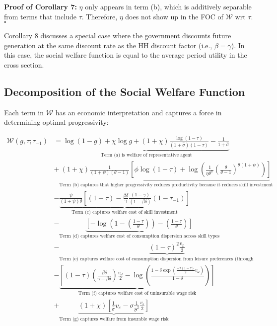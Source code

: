 \documentclass{article}
\begin{document}
\bigskip

\textbf{Proof of Corollary 7:} $\eta$ only appears in term (b), which is additively separable from terms that include $\tau$. Therefore, $\eta$ does not show up in the FOC of $\mathcal{W}$ wrt $\tau$. $\square$

\bigskip

Corollary 8 discusses a special case where the government discounts future generation at the same discount rate as the HH discount factor (i.e., $\beta = \gamma$). In this case, the social welfare function is equal to the average period utility in the cross section.

\pagebreak

\subsection{Decomposition of the Social Welfare Function}

Each term in $\mathcal{W}$ has an economic interpretation and captures a force in determining optimal progressivity:

\begin{align*}
\mathcal{W}(g, \tau; \tau_{-1}) &=
\underbrace{\log(1-g) + \chi \log g + (1+\chi) \frac{\log(1-\tau)}{(1+\hat\sigma)(1-\tau)}- \frac{1}{1+\hat\sigma}}_{\text{Term (a) is welfare of representative agent}} \\
&+\underbrace{(1+\chi)\frac{1}{(1+\psi)(\theta-1)} [ \phi \log(1-\tau) + \log ( \frac{1}{\eta\theta^\psi} ( \frac{\theta}{\theta - 1} )^{\theta(1+\psi)} ) ]}_{\text{Term (b) captures that higher progressivity reduces productivity because it reduces skill investment}}\\
&-\underbrace{\frac{\psi}{(1+\psi)\theta} [ (1-\tau) - \frac{\beta\delta}{\gamma} \frac{(1-\gamma)}{(1-\beta\delta)}(1-\tau_{-1}) ]}_{\text{Term (c) captures welfare cost of skill investment}}\\
&-\underbrace{[ - \log(1-(\frac{1-\tau}{\theta})) - (\frac{1-\tau}{\theta}) ]}_{\text{Term (d) captures welfare cost of consumption dispersion across skill types}}\\
&-\underbrace{(1-\tau)^2\frac{v_\varphi}{2}}_{\text{Term (e) captures welfare cost of consumption dispersion from leisure preferences (through dispersion in hours worked)}}\\
&-\underbrace{[(1-\tau)(\frac{\beta\delta}{\gamma - \beta\delta})\frac{v_{\omega}}{2} - \log(\frac{1-\delta \exp(\frac{-\tau(1-\tau)}{2}v_\omega)}{1-\delta})]}_{\text{Term (f) captures welfare cost of uninsurable wage risk}}\\
&+ \underbrace{(1 + \chi) [\frac{1}{\hat\sigma} v_\varepsilon - \sigma \frac{1}{\hat \sigma^2}\frac{v_\varepsilon}{2}]}_{\text{Term (g) captures welfare from insurable wage risk}}
\end{align*}
\end{document}
